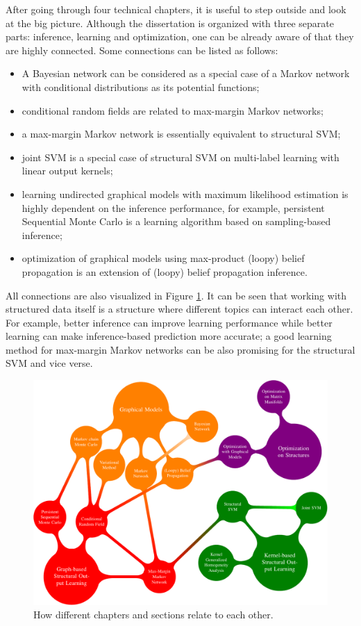 After going through four technical chapters, it is useful to step outside and look at the big picture.    
Although the dissertation is organized with three separate parts: inference, learning and optimization, one can be already 
aware of that they are highly connected.                
Some connections can be listed as follows:  
\begin{itemize}
    \item A Bayesian network can be considered as a special case of a Markov network with conditional distributions as its potential functions;        
	\item conditional random fields are related to max-margin Markov networks;
	\item a max-margin Markov network is essentially equivalent to structural SVM;  
	\item joint SVM is a special case of structural SVM on multi-label learning with linear output kernels;        
	\item learning undirected graphical models with maximum likelihood estimation is highly dependent on the inference performance, for example, 
		persistent Sequential Monte Carlo is a learning algorithm based on sampling-based inference;            
	\item optimization of graphical models using max-product (loopy) belief propagation is an extension of (loopy) belief propagation inference.     
\end{itemize}
All connections are also visualized in Figure \ref{fig:conclusion}. It can be seen that working with structured data itself is a 
structure where different topics can interact each other. For example, better inference can improve learning performance while better learning 
can make inference-based prediction more accurate; a good learning method for max-margin Markov networks can be also promising for the structural SVM and 
vice verse.  
\begin{figure}[h]
	\includegraphics[width=\textwidth]{./Figures/Conclusion_figure-crop}
\caption{How different chapters and sections relate to each other.  }
\label{fig:conclusion}
\end{figure}



